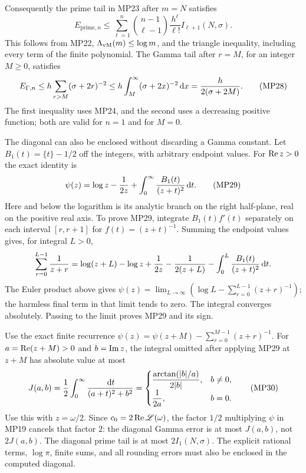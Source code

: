 \documentclass[11pt]{article}
\begin{document}
Consequently the prime tail in MP23 after $m=N$ satisfies
\begin{equation}
 E_{\mathrm{prime},n}\leq
 \sum_{\ell=1}^n\binom{n-1}{\ell-1}\frac{h^\ell}{\ell!}
                                     I_{\ell+1}(N,\sigma).
 \tag{MP27}
\end{equation}
This follows from MP22, $\Lambda_{\mathrm{vM}}(m)\leq\log m$, and the triangle inequality,
including every term of the finite polynomial. The Gamma tail after
$r=M$, for an integer $M\geq0$, satisfies
\begin{equation}
 E_{\Gamma,n}\leq h\sum_{r>M}(\sigma+2r)^{-2}
       \leq h\int_M^\infty(\sigma+2x)^{-2}\,\mathrm d x
       =\frac h{2(\sigma+2M)}.\tag{MP28}
\end{equation}
The first inequality uses MP24, and the second uses a decreasing positive
function; both are valid for $n=1$ and for $M=0$.

The diagonal can also be enclosed without discarding a Gamma constant.
Let $B_1(t)=\{t\}-1/2$ off the integers, with arbitrary endpoint values.
For $\operatorname{Re} z>0$ the exact identity is
\begin{equation}
 \psi(z)=\log z-\frac1{2z}
       +\int_0^\infty\frac{B_1(t)}{(z+t)^2}\,\mathrm d t.
 \tag{MP29}
\end{equation}
Here and below the logarithm is its analytic branch on the right
half-plane, real on the positive real axis. To prove MP29, integrate
$B_1(t)f'(t)$ separately on each interval $[r,r+1]$ for
$f(t)=(z+t)^{-1}$. Summing the endpoint values gives, for integral $L>0$,
\[
 \sum_{r=0}^{L-1}\frac1{z+r}
 =\log(z+L)-\log z+\frac1{2z}-\frac1{2(z+L)}
                  -\int_0^L\frac{B_1(t)}{(z+t)^2}\,\mathrm d t.
\]
The Euler product above gives
$\psi(z)=\lim_{L\to\infty}(\log L-\sum_{r=0}^{L-1}(z+r)^{-1})$;
the harmless final term in that limit tends to zero. The integral
converges absolutely. Passing to the limit proves MP29 and its sign.

Use the exact finite recurrence
$\psi(z)=\psi(z+M)-\sum_{r=0}^{M-1}(z+r)^{-1}$.
For $a=\operatorname{Re}(z+M)>0$ and $b=\operatorname{Im} z$, the integral omitted after applying
MP29 at $z+M$ has absolute value at most
\begin{equation}
 J(a,b)=\frac12\int_0^\infty\frac{\,\mathrm d t}{(a+t)^2+b^2}
 =\begin{cases}
 \displaystyle\frac{\arctan(|b|/a)}{2|b|},&b\ne0,\\[5pt]
 \displaystyle\frac1{2a},&b=0.
 \end{cases}\tag{MP30}
\end{equation}
Use this with $z=\omega/2$. Since $c_0=2\operatorname{Re}\mathscr L(\omega)$, the
factor $1/2$ multiplying $\psi$ in MP19 cancels that factor $2$:
the diagonal Gamma error is at most $J(a,b)$, not $2J(a,b)$.
The diagonal prime tail is at most $2I_1(N,\sigma)$.
The explicit rational terms, $\log\pi$, finite sums, and all rounding
errors must also be enclosed in the computed diagonal.
\end{document}
